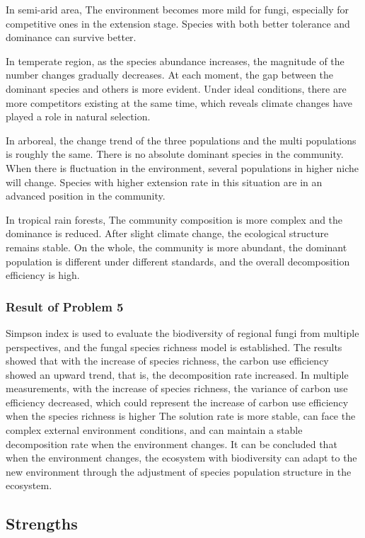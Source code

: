 \documentclass{mcmthesis}
\begin{document}
In semi-arid area, The environment becomes more mild for fungi, especially for competitive ones in the extension stage. Species with both better tolerance and dominance can survive better.

In temperate region, as the species abundance increases, the magnitude of the number changes gradually decreases. At each moment, the gap between the dominant species and others is more evident. Under ideal conditions, there are more competitors existing at the same time, which reveals climate changes have played a role in natural selection.

In arboreal,  the change trend of the three populations and the multi populations is roughly the same. There is no absolute dominant species in the community. When there is fluctuation in the environment, several populations in higher niche will change. Species with higher extension rate in this situation are in an advanced position in the community.

In tropical rain forests, The community composition is more complex and the dominance is reduced. After slight climate change, the ecological structure remains stable. On the whole, the community is more abundant, the dominant population is different under different standards, and the overall decomposition efficiency is high.

\subsubsection{Result of Problem 5}

Simpson index is used to evaluate the biodiversity of regional fungi from multiple perspectives, and the fungal species richness model is established. The results showed that with the increase of species richness, the carbon use efficiency showed an upward trend, that is, the decomposition rate increased. In multiple measurements, with the increase of species richness, the variance of carbon use efficiency decreased, which could represent the increase of carbon use efficiency when the species richness is higher The solution rate is more stable, can face the complex external environment conditions, and can maintain a stable decomposition rate when the environment changes. It can be concluded that when the environment changes, the ecosystem with biodiversity can adapt to the new environment through the adjustment of species population structure in the ecosystem.

\subsection{Strengths}
\end{document}
